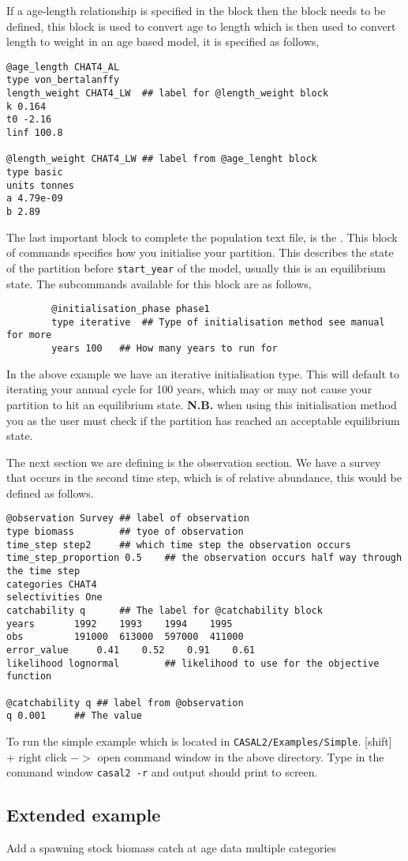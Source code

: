 If a age-length relationship is specified in the  block then the  block needs to be defined, this block is used to convert age to length which is then used to convert length to weight in an age based model, it is specified as follows,
{\small{\begin{verbatim}
@age_length CHAT4_AL
type von_bertalanffy
length_weight CHAT4_LW	## label for @length_weight block
k 0.164
t0 -2.16
linf 100.8

@length_weight CHAT4_LW	## label from @age_lenght block
type basic
units tonnes
a 4.79e-09 
b 2.89 
		\end{verbatim}}}

The last important block to complete the population text file, is the . This block of commands specifies how you initialise your partition. This describes the state of the partition before \texttt{start\_year} of the model, usually this is an equilibrium state. The subcommands available for this block are as follows,
{\small{\begin{verbatim}
		@initialisation_phase phase1
		type iterative	## Type of initialisation method see manual for more
		years 100	## How many years to run for
		\end{verbatim}}}

In the above example we have an iterative initialisation type. This will default to iterating your annual cycle for 100 years, which may or may not cause your partition to hit an equilibrium state. \textbf{N.B.} when using this initialisation method you as the user must check if the partition has reached an acceptable equilibrium state.

The next section we are defining is the observation section. We have a survey that occurs in the second time step, which is of relative abundance, this would be defined as follows.

{\small{\begin{verbatim}
@observation Survey	## label of observation
type biomass 		## tyoe of observation
time_step step2		## which time step the observation occurs
time_step_proportion 0.5	## the observation occurs half way through the time step
categories CHAT4
selectivities One
catchability q		## The label for @catchability block
years 		1992 	1993 	1994 	1995 	
obs 		191000	613000	597000	411000	
error_value 	0.41	0.52	0.91	0.61
likelihood lognormal		## likelihood to use for the objective function

@catchability q	## label from @observation
q 0.001		## The value
		\end{verbatim}}}

To run the simple example which is located in \texttt{CASAL2/Examples/Simple}. [shift] + right click $->$ open command window in the above directory. Type in the command window \texttt{casal2 -r} and output should print to screen.

\subsection{Extended example}\label{Sec:exte}
Add a spawning stock biomass
catch at age data
multiple categories

